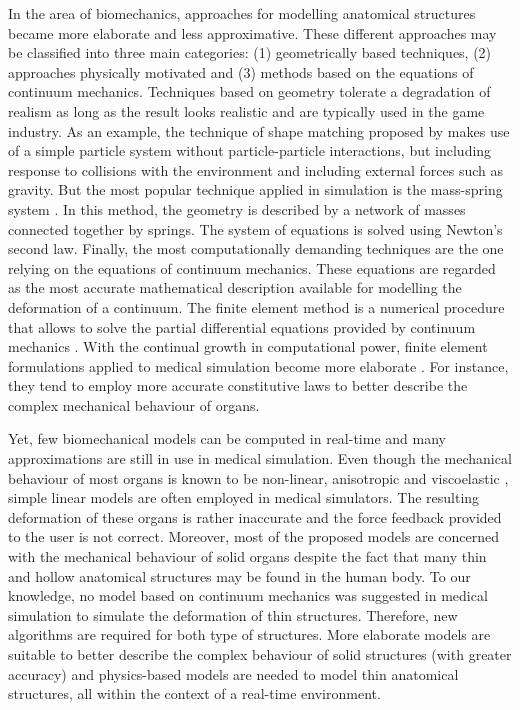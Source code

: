 In the area of biomechanics, approaches for modelling anatomical structures became more elaborate and less approximative. These different approaches may be classified into three main categories: (1) geometrically based techniques, (2) approaches physically motivated and (3) methods based on the equations of continuum mechanics. Techniques based on geometry tolerate a degradation of realism as long as the result looks realistic and are typically used in the game industry. As an example, the technique of shape matching proposed by \cite{Muller05} makes use of a simple particle system without particle-particle interactions, but including response to collisions with the environment and including external forces such as gravity. But the most popular technique applied in simulation is the mass-spring system \citep{Terzopoulos91,Provot95,Mosegaard05b}. In this method, the geometry is described by a network of masses connected together by springs. The system of equations is solved using Newton's second law. Finally, the most computationally demanding techniques are the one relying on the equations of continuum mechanics. These equations are regarded as the most accurate mathematical description available for modelling the deformation of a continuum. The finite element method is a numerical procedure that allows to solve the partial differential equations provided by continuum mechanics \citep{Cotin99}. With the continual growth in computational power, finite element formulations applied to medical simulation become more elaborate \citep{Sagar94,Felippa00,Debunne01,Miller07}. For instance, they tend to employ more accurate constitutive laws to better describe the complex mechanical behaviour of organs. 

Yet, few biomechanical models can be computed in real-time and many approximations are still in use in medical simulation. Even though the mechanical behaviour of most organs is known to be non-linear, anisotropic and viscoelastic \citep{Fung93}, simple linear models are often employed in medical simulators. The resulting deformation of these organs is rather inaccurate and the force feedback provided to the user is not correct. Moreover, most of the proposed models are concerned with the mechanical behaviour of solid organs despite the fact that many thin and hollow anatomical structures may be found in the human body. To our knowledge, no model based on continuum mechanics was suggested in medical simulation to simulate the deformation of thin structures. Therefore, new algorithms are required for both type of structures. More elaborate models are suitable to better describe the complex behaviour of solid structures (with greater accuracy) and physics-based models are needed to model thin anatomical structures, all within the context of a real-time environment.


